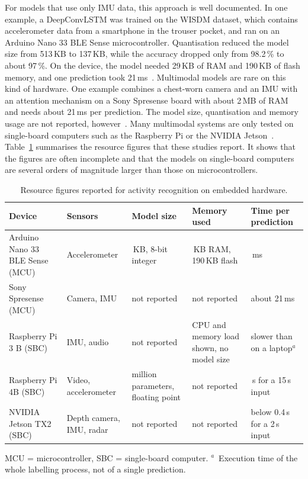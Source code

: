 For models that use only IMU data, this approach is well documented. In one
example, a DeepConvLSTM was trained on the WISDM dataset, which contains
accelerometer data from a smartphone in the trouser pocket, and ran on an
Arduino Nano 33 BLE Sense microcontroller. Quantisation reduced the model size
from 513\,KB to 137\,KB, while the accuracy dropped only from 98.2\,\% to about
97\,\%. On the device, the model needed 29\,KB of RAM and 190\,KB of flash
memory, and one prediction took 21\,ms~\cite{zhou2025efficient}. Multimodal
models are rare on this kind of hardware. One example combines a chest-worn
camera and an IMU with an attention mechanism on a Sony Spresense board with
about 2\,MB of RAM and needs about 21\,ms per prediction. The model size,
quantisation and memory usage are not reported,
however~\cite{nakabayashi2024multimodal}. Many multimodal systems are only
tested on single-board computers such as the Raspberry Pi or the NVIDIA
Jetson~\cite{chatterjee2020laso, gao2023mmtsa, ouyang2022cosmo}.
Table~\ref{tab:sota-deployment} summarises the resource figures that these
studies report. It shows that the figures are often incomplete and that the
models on single-board computers are several orders of magnitude larger than
those on microcontrollers.

\begin{table}[!ht]
\centering
\small
\renewcommand{\arraystretch}{1.2}
\begin{tabularx}{\textwidth}{|>{\raggedright\arraybackslash}p{2.6cm}|>{\raggedright\arraybackslash}p{2.2cm}|>{\raggedright\arraybackslash}X|>{\raggedright\arraybackslash}X|>{\raggedright\arraybackslash}p{2.2cm}|}
\hline
\textbf{Device} & \textbf{Sensors} & \textbf{Model size} & \textbf{Memory used}
  & \textbf{Time per prediction} \\
\hline
Arduino Nano 33 BLE Sense (MCU)~\cite{zhou2025efficient}
  & Accelerometer & 137\,KB, 8-bit integer & 29\,KB RAM, 190\,KB flash & 21\,ms \\
\hline
Sony Spresense (MCU)~\cite{nakabayashi2024multimodal}
  & Camera, IMU & not reported & not reported & about 21\,ms \\
\hline
Raspberry Pi 3 B (SBC)~\cite{chatterjee2020laso}
  & IMU, audio & not reported & CPU and memory load shown, no model size
  & slower than on a laptop$^{a}$ \\
\hline
Raspberry Pi 4B (SBC)~\cite{gao2023mmtsa}
  & Video, accelerometer & 32.4 million parameters, floating point
  & not reported & 5.8\,s for a 15\,s input \\
\hline
NVIDIA Jetson TX2 (SBC)~\cite{ouyang2022cosmo}
  & Depth camera, IMU, radar & not reported & not reported
  & below 0.4\,s for a 2\,s input \\
\hline
\end{tabularx}

\vspace{1mm}
{\footnotesize\raggedright
MCU = microcontroller, SBC = single-board computer.
$^{a}$~Execution time of the whole labelling process, not of a single prediction.\par}
\caption{Resource figures reported for activity recognition on embedded
hardware.}
\label{tab:sota-deployment}
\end{table}

